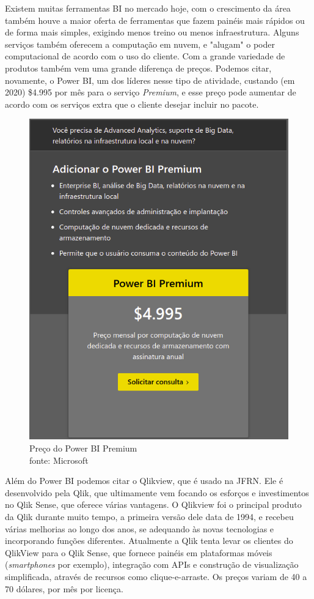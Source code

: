 Existem muitas ferramentas BI no mercado hoje, com o crescimento da área também houve a maior oferta de ferramentas que fazem painéis mais rápidos ou de forma mais simples, exigindo menos treino ou menos infraestrutura. Alguns serviços também oferecem a computação em nuvem, e "alugam" o poder computacional de acordo com o uso do cliente. Com a grande variedade de produtos também vem uma grande diferença de preços. Podemos citar, novamente, o Power BI, um dos líderes nesse tipo de atividade, custando (em 2020) \$4.995 por mês para o serviço \textit{Premium}, e esse preço pode aumentar de acordo com os serviços extra que o cliente desejar incluir no pacote.

\begin{figure}[h]
	\centering
	\includegraphics[scale=0.40]{./figures/cap1/powerbi.png}
	\caption{Preço do Power BI Premium \\ fonte: Microsoft}
\end{figure}


Além do Power BI podemos citar o Qlikview, que é usado na JFRN. Ele é desenvolvido pela Qlik, que ultimamente vem focando os esforços e investimentos no Qlik Sense, que oferece várias vantagens. O Qlikview foi o principal produto da Qlik durante muito tempo, a primeira versão dele data de 1994, e recebeu várias melhorias ao longo dos anos, se adequando às novas tecnologias e incorporando funções diferentes. Atualmente a Qlik tenta levar os clientes do QlikView para o Qlik Sense, que fornece painéis em plataformas móveis (\textit{smartphones} por exemplo), integração com APIs e construção de visualização simplificada, através de recursos como clique-e-arraste. Os preços variam de 40 a 70 dólares, por mês por licença.

